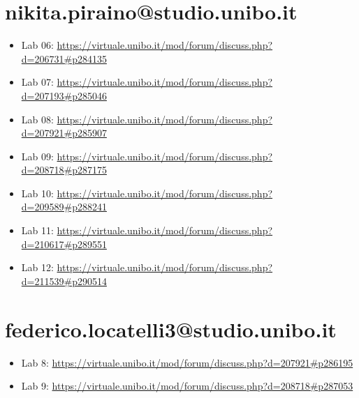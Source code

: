\documentclass[11pt, a4paper, oneside]{report}
\begin{document}
\section*{nikita.piraino@studio.unibo.it}
\begin{itemize}
    \item Lab 06: \url{https://virtuale.unibo.it/mod/forum/discuss.php?d=206731#p284135}
    \item Lab 07: \url{https://virtuale.unibo.it/mod/forum/discuss.php?d=207193#p285046}
    \item Lab 08: \url{https://virtuale.unibo.it/mod/forum/discuss.php?d=207921#p285907}
    \item Lab 09: \url{https://virtuale.unibo.it/mod/forum/discuss.php?d=208718#p287175}
    \item Lab 10: \url{https://virtuale.unibo.it/mod/forum/discuss.php?d=209589#p288241}
    \item Lab 11: \url{https://virtuale.unibo.it/mod/forum/discuss.php?d=210617#p289551}
    \item Lab 12: \url{https://virtuale.unibo.it/mod/forum/discuss.php?d=211539#p290514}
\end{itemize}

\section*{federico.locatelli3@studio.unibo.it}
\begin{itemize}
    \item Lab 8: \url{https://virtuale.unibo.it/mod/forum/discuss.php?d=207921#p286195}
    \item Lab 9: \url{https://virtuale.unibo.it/mod/forum/discuss.php?d=208718#p287053}
\end{itemize}
\end{document}
